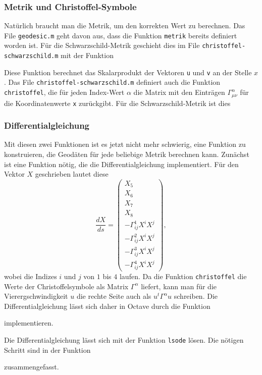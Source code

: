\subsubsection{Metrik und Christoffel-Symbole}
Natürlich braucht man die Metrik, um den korrekten Wert zu berechnen.
Das File \texttt{geodesic.m} geht davon aus, dass die Funktion \texttt{metrik}
bereits definiert worden ist.
Für die Schwarzschild-Metrik geschieht dies im File
\texttt{christoffel-schwarzschild.m} mit der Funktion

Diese Funktion berechnet das Skalarprodukt der Vektoren \texttt{u} und
\texttt{v} an der Stelle $x$.
Das File \texttt{christoffel-schwarzschild.m} definiert auch die Funktion
\texttt{christoffel}, die für jeden Index-Wert $\alpha$ die Matrix mit
den Einträgen $\Gamma^\alpha_{\mu\nu}$ für die Koordinatenwerte \texttt{x}
zurückgibt.
Für die Schwarzschild-Metrik ist dies


\subsubsection{Differentialgleichung}
Mit diesen zwei Funktionen ist es jetzt nicht mehr schwierig, eine Funktion
zu konstruieren, die Geodäten für jede beliebige Metrik berechnen kann.
Zunächst ist eine Funktion nötig, die die Differentialgleichung implementiert.
Für den Vektor $X$ geschrieben lautet diese
\[
\frac{dX}{ds}
=
\begin{pmatrix}
X_5\\X_6\\X_7\\X_8
\\
-\Gamma^1_{ij}X^iX^j\\
-\Gamma^2_{ij}X^iX^j\\
-\Gamma^3_{ij}X^iX^j\\
-\Gamma^4_{ij}X^iX^j
\end{pmatrix},
\]
wobei die Indizes $i$ und $j$ von $1$ bis $4$ laufen.
Da die Funktion \texttt{christoffel} die Werte der Christoffelsymbole
als Matrix $\Gamma^\alpha$ liefert, kann man für die Vierergschwindigkeit
$u$ die rechte Seite auch als $u^t \Gamma^\alpha u$ schreiben.
Die Differentialgleichung lässt sich daher in Octave durch die
Funktion

implementieren.

Die Differentialgleichung lässt sich mit der Funktion \texttt{lsode}
lösen.
Die nötigen Schritt sind in der Funktion

zusammengefasst.

